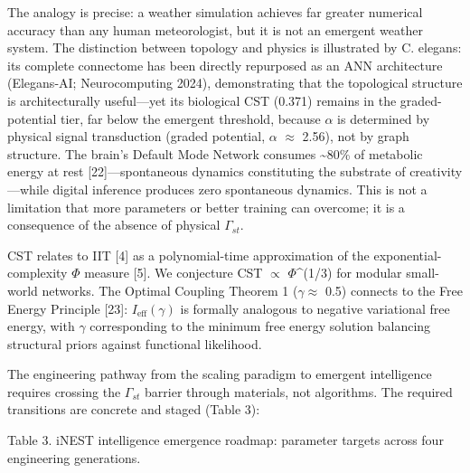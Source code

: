 \documentclass[a4paper,12pt]{article}
\begin{document}
The analogy is precise: a weather simulation achieves far greater numerical accuracy than any human meteorologist, but it is not an emergent weather system.
The distinction between topology and physics is illustrated by C. elegans: its complete connectome has been directly repurposed as an ANN architecture (Elegans-AI; Neurocomputing 2024), demonstrating that the topological structure is architecturally useful---yet its biological CST (0.371) remains in the graded-potential tier, far below the emergent threshold, because $\alpha$ is determined by physical signal transduction (graded potential, $\alpha$ $\approx$ 2.56), not by graph structure.
The brain's Default Mode Network consumes \textasciitilde{}80\% of metabolic energy at rest [22]---spontaneous dynamics constituting the substrate of creativity---while digital inference produces zero spontaneous dynamics.
This is not a limitation that more parameters or better training can overcome; it is a consequence of the absence of physical $\Gamma_{st}$.


CST relates to IIT [4] as a polynomial-time approximation of the exponential-complexity $\Phi$ measure [5]. We conjecture CST $\propto$ $\Phi$^(1/3) for modular small-world networks. The Optimal Coupling Theorem 1 ($\gamma \approx$ 0.5) connects to the Free Energy Principle [23]: $I_{\text{eff}}(\gamma)$ is formally analogous to negative variational free energy, with $\gamma$ corresponding to the minimum free energy solution balancing structural priors against functional likelihood.


The engineering pathway from the scaling paradigm to emergent intelligence requires crossing the $\Gamma_{st}$ barrier through materials, not algorithms. The required transitions are concrete and staged (Table 3):


Table 3. iNEST intelligence emergence roadmap: parameter targets across four engineering generations.
\end{document}
